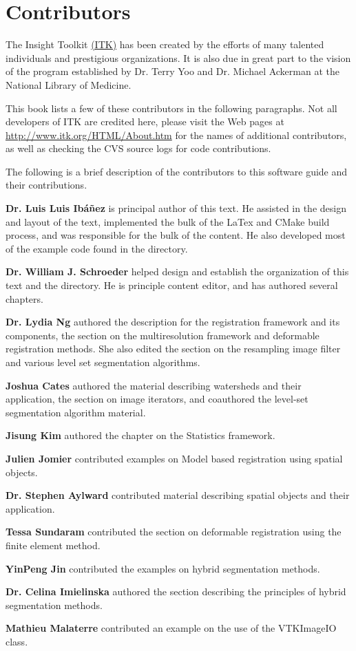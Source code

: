 \chapter*{Contributors}
\noindent

The Insight Toolkit \href{http://www.itk.org}{(ITK)} has been created by the
efforts of many talented individuals and prestigious organizations. It is also
due in great part to the vision of the program established by Dr. Terry Yoo
and Dr. Michael Ackerman at the National Library of Medicine.

This book lists a few of these contributors in the following paragraphs. Not
all developers of ITK are credited here, please visit the Web pages at
\href{http://www.itk.org/HTML/About.htm}{http://www.itk.org/HTML/About.htm} 
for the names of additional contributors, as well as checking the CVS source
logs for code contributions.

The following is a brief description of the contributors to this software
guide and their contributions.

{\bf Dr. Luis Luis Ib\'{a}\~{n}ez} is principal author of this text.
He assisted in the design and layout of the text, implemented the bulk of
the LaTex and CMake build process, and was responsible for the bulk of 
the content. He also developed most of the example code found in the
 directory.

{\bf Dr. William J. Schroeder} helped design and establish the organization 
of this text and the  directory. He is principle 
content editor, and has authored several chapters.

{\bf Dr. Lydia Ng} authored the description for the registration framework and
its components, the section on the multiresolution framework and deformable
registration methods. She also edited the section on the resampling image
filter and various level set segmentation algorithms.

{\bf Joshua Cates} authored the material describing watersheds and their
application, the section on image iterators, and coauthored the level-set 
segmentation algorithm material.

{\bf Jisung Kim} authored the chapter on the Statistics framework.

{\bf Julien Jomier} contributed examples on Model based registration using
spatial objects.

{\bf Dr. Stephen Aylward}  contributed material describing spatial objects and
their application.

{\bf Tessa Sundaram} contributed the section on deformable registration using
the finite element method.

{\bf YinPeng Jin} contributed the examples on  hybrid segmentation methods. 

{\bf Dr. Celina Imielinska} authored the section describing the principles of
hybrid segmentation methods.

{\bf Mathieu Malaterre} contributed an example on the use of the VTKImageIO class.



